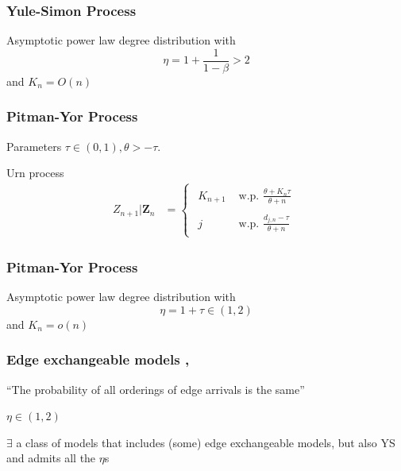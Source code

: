 \documentclass[final,hyperref={pdfpagelabels=false},noamsthm]{beamer}
\newcommand{\ee}{Z} %
\newcommand{\bfee}{\mathbf{\ee}}
\begin{document}
\begin{frame}
	\frametitle{Yule-Simon Process}
	Asymptotic power law degree distribution with
	\begin{equation*}
		\eta = 1 + \frac{1}{1-\beta} > 2
	\end{equation*}
	and $K_n = O(n)$
\end{frame}

\begin{frame}
	\frametitle{Pitman-Yor Process}
	Parameters $\tau \in (0, 1), \theta > -\tau$.
	\vspace{15pt}
	
	Urn process
	\begin{align*} 
	\ee_{n+1} | \bfee_{n} &= \begin{cases}\begin{aligned}
	K_{n+1} & \text{ w.p. } \frac{\theta + K_n \tau}{\theta + n}  \\
	& \\
	j &\text{ w.p. } \frac{d_{j,n} - \tau}{\theta + n} 
	\end{aligned}\end{cases}
	\label{eq:pyp2}
	\end{align*}
\end{frame}

\begin{frame}
	\frametitle{Pitman-Yor Process}
	Asymptotic power law degree distribution with
	\begin{equation*}
		\eta = 1 + \tau \in (1, 2)
	\end{equation*}
	and $K_n = o(n)$
\end{frame}


\begin{frame}
	\frametitle{Edge exchangeable models \cite{cai2016}, \cite{CraneDempsey2017}}
	``The probability of all orderings of edge arrivals is the same''
	
	\vspace{20pt}
	
	$\eta \in (1,2)$
	
	$\exists$ a class of models that includes (some) edge exchangeable models, but also YS and admits all the $\eta$s
	
\end{frame}
\end{document}
